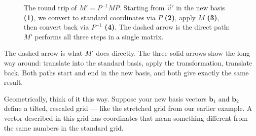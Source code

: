 \documentclass[11pt,openany]{book}
\theoremstyle{definition}
\begin{document}
\begin{figure}[H]
{%
}
\caption{The round trip of $M' = P^{-1}MP$. Starting from $\vec{v}'$ in the new basis
\textbf{(1)}, we convert to standard coordinates via $P$ \textbf{(2)}, apply $M$
\textbf{(3)}, then convert back via $P^{-1}$ \textbf{(4)}. The dashed arrow is the
direct path: $M'$ performs all three steps in a single matrix.}
\label{fig:change_of_basis_roundtrip}
\end{figure}

\medskip

The dashed arrow is what $M'$ does directly. The three solid arrows show the long way 
around: translate into the standard basis, apply the transformation, translate back. 
Both paths start and end in the new basis, and both give exactly the same result.


\medskip

Geometrically, think of it this way. Suppose your new basis vectors $\mathbf{b}_1$ 
and $\mathbf{b}_2$ define a tilted, rescaled grid --- like the stretched grid from 
our earlier example. A vector described in this grid has coordinates that mean 
something different from the same numbers in the standard grid.
\end{document}
